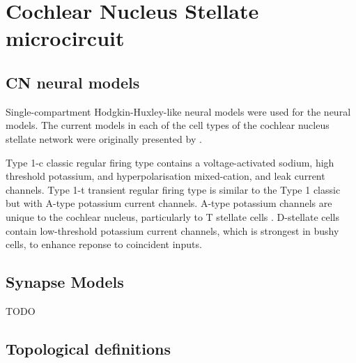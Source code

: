 




\section{Cochlear Nucleus Stellate microcircuit    \label{sec:CN:cochl-nucl-stell}}

\subsection{CN neural models}

Single-compartment Hodgkin-Huxley-like neural models were used for the neural models.
The current models in each of the cell types of the cochlear nucleus stellate network were originally presented by \citet{RothmanManis:2003b}.


Type 1-c classic regular firing type contains a voltage-activated sodium, high threshold potassium, and hyperpolarisation mixed-cation, and leak current channels.
Type 1-t transient regular firing type is similar to the Type 1 classic but with A-type potassium current channels.
A-type potassium channels are unique to the cochlear nucleus, particularly to T stellate cells \citep{RothmanManis:2003,RothmanManis:2003a,RothmanManis:2003b}.
D-stellate cells contain low-threshold potassium current channels, which is strongest in bushy cells, to enhance reponse to coincident inputs.




\subsection{Synapse Models}

TODO

\subsection{Topological definitions    \label{sec:CN:tonot-conn}}

